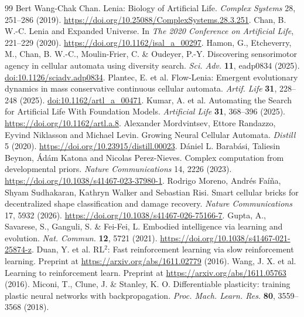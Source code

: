 \begin{thebibliography}{99}
 Bert Wang-Chak Chan. Lenia: Biology of Artificial Life. \emph{Complex Systems} 28, 251--286 (2019). \url{https://doi.org/10.25088/ComplexSystems.28.3.251}.
 Chan, B. W.-C. Lenia and Expanded Universe. In \emph{The 2020 Conference on Artificial Life}, 221--229 (2020). \url{https://doi.org/10.1162/isal_a_00297}.
 Hamon, G., Etcheverry, M., Chan, B. W.-C., Moulin-Frier, C. \& Oudeyer, P.-Y. Discovering sensorimotor agency in cellular automata using diversity search. \emph{Sci. Adv.} \textbf{11}, eadp0834 (2025). \href{https://doi.org/10.1126/sciadv.adp0834}{doi:10.1126/sciadv.adp0834}.
 Plantec, E. et al. Flow-Lenia: Emergent evolutionary dynamics in mass conservative continuous cellular automata. \emph{Artif. Life} \textbf{31}, 228--248 (2025). \href{https://doi.org/10.1162/artl_a_00471}{doi:10.1162/artl\_a\_00471}.
 Kumar, A. et al. Automating the Search for Artificial Life With Foundation Models. \emph{Artificial Life} \textbf{31}, 368--396 (2025). \url{https://doi.org/10.1162/artl.a.8}.
 Alexander Mordvintsev, Ettore Randazzo, Eyvind Niklasson and Michael Levin. Growing Neural Cellular Automata. \emph{Distill} 5 (2020). \url{https://doi.org/10.23915/distill.00023}.
 D\'{a}niel L. Barab\'{a}si, Taliesin Beynon, \'{A}d\'{a}m Katona and Nicolas Perez-Nieves. Complex computation from developmental priors. \emph{Nature Communications} 14, 2226 (2023). \url{https://doi.org/10.1038/s41467-023-37980-1}.
 Rodrigo Moreno, Andr\'{e}s Fa\'{i}\~{n}a, Shyam Sudhakaran, Kathryn Walker and Sebastian Risi. Smart cellular bricks for decentralized shape classification and damage recovery. \emph{Nature Communications} 17, 5932 (2026). \url{https://doi.org/10.1038/s41467-026-75166-7}.
 Gupta, A., Savarese, S., Ganguli, S. \& Fei-Fei, L. Embodied intelligence via learning and evolution. \emph{Nat. Commun.} \textbf{12}, 5721 (2021). \url{https://doi.org/10.1038/s41467-021-25874-z}.
 Duan, Y. et al. RL$^2$: Fast reinforcement learning via slow reinforcement learning. Preprint at \url{https://arxiv.org/abs/1611.02779} (2016).
 Wang, J. X. et al. Learning to reinforcement learn. Preprint at \url{https://arxiv.org/abs/1611.05763} (2016).
 Miconi, T., Clune, J. \& Stanley, K. O. Differentiable plasticity: training plastic neural networks with backpropagation. \emph{Proc. Mach. Learn. Res.} \textbf{80}, 3559--3568 (2018).

\end{thebibliography}
